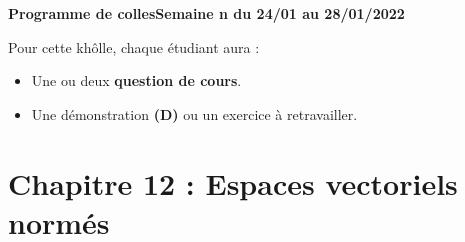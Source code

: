 \documentclass[twoside,a4paper,french,10pt]{VcCours}
\begin{document}

\begin{center}
\large\bf
Programme de collesSemaine n du 24/01 au 28/01/2022
\end{center}
\separationTitre


Pour cette khôlle, chaque étudiant aura :
\begin{itemize}
\item Une ou deux \textbf{question de cours}.
\item Une démonstration \textbf{(D)} ou un exercice à retravailler.
\end{itemize} 
  

\section*{Chapitre 12 : Espaces vectoriels normés}
\end{document}
